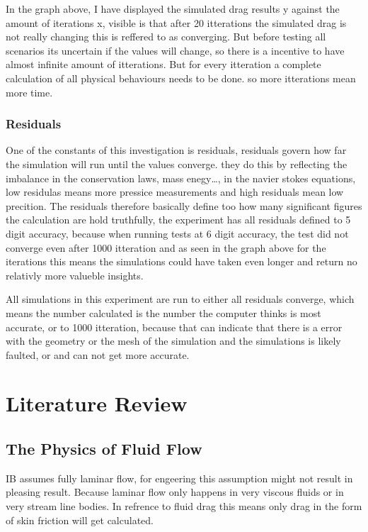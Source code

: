 \documentclass[12pt,a4paper]{article}
\begin{document}
In the graph above, I have displayed the simulated drag results y against the amount of iterations x, visible is that after 20 itterations the simulated drag is not really changing this is reffered to as converging. But before testing all scenarios its uncertain if the values will change, so there is a incentive to have almost infinite amount of itterations. But for every itteration a complete calculation of all physical behaviours needs to be done. so more itterations mean more time.

\subsubsection{Residuals}

One of the constants of this investigation is residuals, residuals govern how far the simulation will run until the values converge. they do this by reflecting the imbalance in the conservation laws, mass enegy…, in the navier stokes equations, low residulas means more pressice measurements and high residuals mean low precition. The residuals therefore basically define too how many significant figures the calculation are hold truthfully, the experiment has all residuals defined to 5 digit accuracy, because when running tests at 6 digit accuracy, the test did not converge even after 1000 itteration and as seen in the graph above for the iterations this means the simulations could have taken even longer and return no relativly more valueble insights. 

All simulations in this experiment are run to either all residuals converge, which means the number calculated is the number the computer thinks is most accurate, or to 1000 itteration, because that can indicate that there is a error with the geometry or the mesh of the simulation and the simulations is likely faulted, or and can not get more accurate.


\section{Literature Review}

\subsection{The Physics of Fluid Flow}

IB assumes fully laminar flow, for engeering this assumption might not result in pleasing result. Because laminar flow only happens in very viscous fluids or in very stream line bodies. In refrence to fluid drag this means only drag in the form of skin friction will get calculated.
\end{document}
